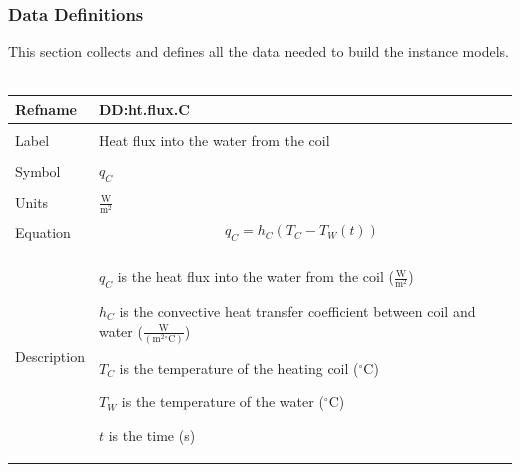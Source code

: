 \documentclass[12pt]{article}
\begin{document}
\subsubsection{Data Definitions}
\label{Sec:DDs}
This section collects and defines all the data needed to build the instance models.
~\newline
 \noindent \begin{minipage}{\textwidth}
\begin{tabular}{p{} p{}}
\toprule \textbf{Refname} & \textbf{DD:ht.flux.C}
\label{DD:ht.flux.C}
\\ \midrule \\
Label & Heat flux into the water from the coil
        \\ \midrule \\
        Symbol & ${q_{C}}$
                 \\ \midrule \\
                 Units & $\frac{\text{W}}{\text{m}^{2}}$
                         \\ \midrule \\
                         Equation & \begin{dmath}
                                    {q_{C}}={h_{C}} \left({T_{C}}-{T_{W}}\left(t\right)\right)
                                    \end{dmath}
                                    \\ \midrule \\
                                    Description & \begin{symbDescription}
                                                  \item{${q_{C}}$ is the heat flux into the water from the coil ($\frac{\text{W}}{\text{m}^{2}}$)}
                                                  \item{${h_{C}}$ is the convective heat transfer coefficient between coil and water ($\frac{\text{W}}{(\text{m}^{2}{}^{\circ}\text{C})}$)}
                                                  \item{${T_{C}}$ is the temperature of the heating coil (${}^{\circ}$C)}
                                                  \item{${T_{W}}$ is the temperature of the water (${}^{\circ}$C)}
                                                  \item{$t$ is the time (s)}
                                                  \end{symbDescription}

\end{tabular}
\end{minipage}
\end{document}
